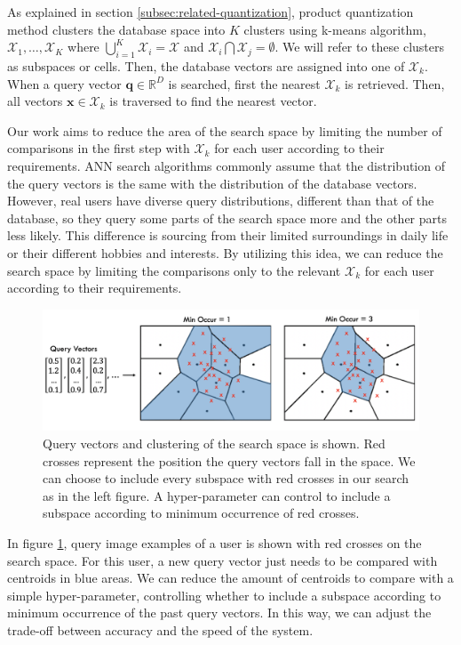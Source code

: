 As explained in section \ref{subsec:related-quantization}, product quantization method clusters the database space into $K$ clusters using k-means algorithm, $\mathcal{X}_1,\dots,\mathcal{X}_K$ where $\bigcup_{i=1}^K \mathcal{X}_i = \mathcal{X}$ and $\mathcal{X}_i \bigcap \mathcal{X}_j = \emptyset$. 
We will refer to these clusters as subspaces or cells.
Then, the database vectors are assigned into one of $\mathcal{X}_k$.
When a query vector $\bm{q}\in\mathbb{R}^D$ is searched, first the nearest $\mathcal{X}_k$ is retrieved. 
Then, all vectors $\bm{x}\in\mathcal{X}_k$ is traversed to find the nearest vector.

Our work aims to reduce the area of the search space by limiting the number of comparisons in the first step with $\mathcal{X}_k$ for each user according to their requirements. 
ANN search algorithms commonly assume that the distribution of the query vectors is the same with the distribution of the database vectors. 
However, real users have diverse query distributions, different than that of the database, 
so they query some parts of the search space more and the other parts less likely. 
This difference is sourcing from their limited surroundings in daily life or their different hobbies and interests. 
By utilizing this idea, we can reduce the search space by limiting the comparisons only to the relevant $\mathcal{X}_k$ for each user according to their requirements.

\begin{figure}
    \centering
    \includegraphics[width=\textwidth]{thesis/images/improvement-fig.png}
    \caption{Query vectors and clustering of the search space is shown. Red crosses represent the position the query vectors fall in the space. We can choose to include every subspace with red crosses in our search as in the left figure. A hyper-parameter can control to include a subspace according to minimum occurrence of red crosses.}
    \label{fig:motivation}
\end{figure}

In figure \ref{fig:motivation}, query image examples of a user is shown with red crosses on the search space. 
For this user, a new query vector just needs to be compared with centroids in blue areas. 
We can reduce the amount of centroids to compare with a simple hyper-parameter, controlling whether to include a subspace according to minimum occurrence of the past query vectors. 
In this way, we can adjust the trade-off between accuracy and the speed of the system.

